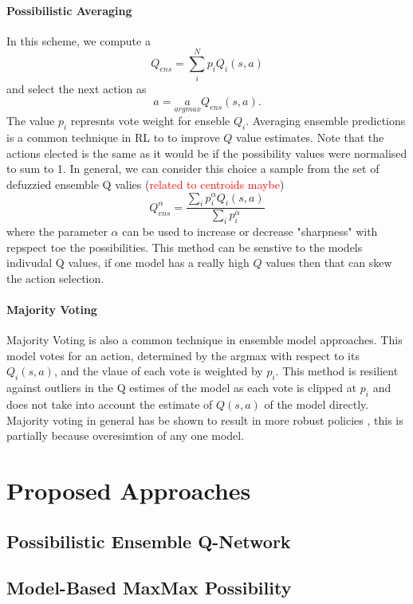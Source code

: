 \documentclass[12pt,a4paper]{report}
\newcommand\myworries[1]{\textcolor{red}{#1}}
\begin{document}
\subsubsection{Possibilistic Averaging}
In this scheme, we compute a \[Q_{ens} = \sum_{i}^N p_i Q_i(s,a)\] and select the next action as \[a = \underset{argmax}{a} Q_{ens}(s, a). \] The value $p_i$ represnts vote weight for enseble $Q_i$.  Averaging ensemble predictions is a common technique in RL to to improve $Q$ value estimates. Note that the actions elected is the same as it would be if the possibility values were normalised to sum to 1. In general, we can consider this choice a sample from the set of defuzzied  ensemble Q valies (\myworries{related to centroids maybe}) 
\[Q_{ens}^\alpha =   \frac{\sum_i p_i^\alpha Q_i(s,a)}{\sum_i p_i^\alpha}\] where the parameter $\alpha$ can be used to increase or decrease "sharpness" with repspect toe the possibilities. This method can be senstive to the models indivudal Q values, if one model has a really high $Q$ values then that can skew the action selection. 

\subsubsection{Majority Voting}
Majority Voting is also a common technique in ensemble model approaches. This model votes for an action, determined by the argmax with respect to its $Q_i(s,a)$, and the vlaue of each vote is weighted by $p_i$. This method is resilient against outliers in the Q estimes of the model as each vote is clipped at $p_i$ and does not take into account the estimate of $Q(s,a)$ of the model directly. Majority voting in general has be shown to result in more robust policies \cite{Hans2010}, this is partially because overesimtion of any one model. 

\chapter{Proposed Approaches}




\section{Possibilistic Ensemble Q-Network}
\section{Model-Based MaxMax Possibility}
\end{document}
